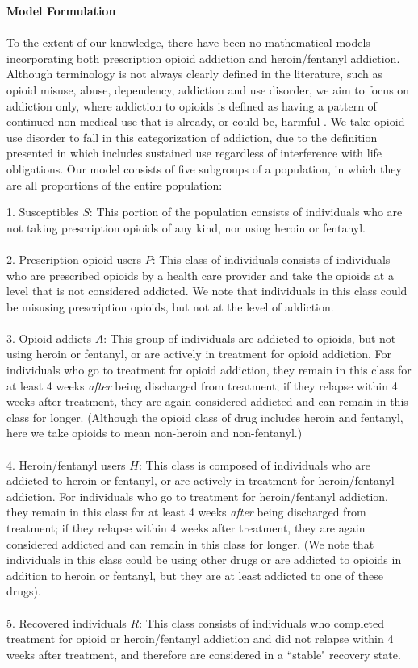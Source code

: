 \documentclass[12pt]{article}
\begin{document}
\textbf{Model Formulation} \\ \\
To the extent of our knowledge, there have been no mathematical models incorporating both prescription opioid addiction and heroin/fentanyl addiction. Although terminology is not always clearly defined in the literature, such as opioid misuse, abuse, dependency, addiction and use disorder, we aim to focus on addiction only, where addiction to opioids is defined as having a pattern of continued non-medical use that is already, or could be, harmful \cite{Vowles}. We take opioid use disorder to fall in this categorization of addiction, due to the definition presented in \cite{SAMSHA2} which includes sustained use regardless of interference with life obligations. Our model consists of five subgroups of a population, in which they are all proportions of the entire population: 

1. Susceptibles $S$: This portion of the population consists of individuals who are not taking prescription opioids of any kind, nor using heroin or fentanyl. \\ \\
2. Prescription opioid users $P$: This class of individuals consists of individuals who are prescribed opioids by a health care provider and take the opioids at a level that is not considered addicted. We note that individuals in this class could be misusing prescription opioids, but not at the level of addiction.  \\ \\ %
3. Opioid addicts $A$: This group of individuals are addicted to opioids, but not using heroin or fentanyl, or are actively in treatment for opioid addiction. For individuals who go to treatment for opioid addiction, they remain in this class for at least 4 weeks \textit{after} being discharged from treatment; if they relapse within 4 weeks after treatment, they are again considered addicted and can remain in this class for longer. (Although the opioid class of drug includes heroin and fentanyl, here we take opioids to mean non-heroin and non-fentanyl.) \\ \\
4. Heroin/fentanyl users $H$: This class is composed of individuals who are addicted to heroin or fentanyl, or are actively in treatment for heroin/fentanyl addiction. For individuals who go to treatment for heroin/fentanyl addiction, they remain in this class for at least 4 weeks \textit{after} being discharged from treatment; if they relapse within 4 weeks after treatment, they are again considered addicted and can remain in this class for longer. (We note that individuals in this class could be using other drugs or are addicted to opioids in addition to heroin or fentanyl, but they are at least addicted to one of these drugs). \\ \\
5. Recovered individuals $R$: This class consists of individuals who completed treatment for opioid or heroin/fentanyl addiction and did not relapse within 4 weeks after treatment, and therefore are considered in a ``stable" recovery state.  
\end{document}

